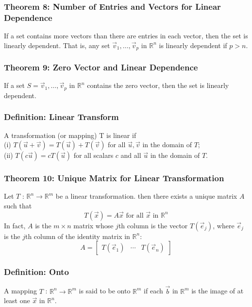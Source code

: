 \documentclass{article}
\begin{document}
\subsubsection*{Theorem 8: Number of Entries and Vectors for Linear Dependence}
If a set contains more vectors than there are entries in each vector, then the set is linearly dependent. That is, any set ${\vec v_1, \dots , \vec v_p}$ in $\mathbb{R}^n$ is linearly dependent if $p > n$. 

\subsubsection*{Theorem 9: Zero Vector and Linear Dependence}
If a set $S = {\vec v_1, \dots, \vec v_p}$ in $\mathbb{R} ^n$ contains the zero vector, then the set is linearly dependent. 

\subsubsection*{Definition: Linear Transform}
A transformation (or mapping) T is linear if
\\(i) $T(\vec u+ \vec v) = T(\vec u) + T(\vec v)$ for all $\vec u, \vec v$ in the domain of $T$;
\\(ii) $T(c \vec u) = cT(\vec u)$ for all scalars $c$ and all $\vec u$ in the domain of $T$.

\subsubsection*{Theorem 10: Unique Matrix for Linear Transformation}
Let $T$ : $\mathbb{R}^n \xrightarrow{} \mathbb{R}^m$ be a linear transformation. then there exists a unique matrix $A$ such that
$$T(\vec x) = A \vec x \text{  for all } \vec x \text{ in }\mathbb{R}^n$$
In fact, $A$ is the $m \times n$ matrix whose $j$th column is the vector $T( \vec e_j)$, where $\vec e_j$ is the $j$th column of the identity matrix in $\mathbb{R}^n$:
$$A = \begin{bmatrix}
    T (\vec e_1) & \cdots & T(\vec e_n) 
\end{bmatrix}$$

\subsubsection*{Definition: Onto}
A mapping $T$ : $\mathbb{R}^n \xrightarrow{} \mathbb{R}^m$ is said to be onto $\mathbb{R}^m$ if each $\vec b$ in $\mathbb{R}^m$ is the image of at least one $\vec x$ in $\mathbb{R}^n$.
\end{document}
